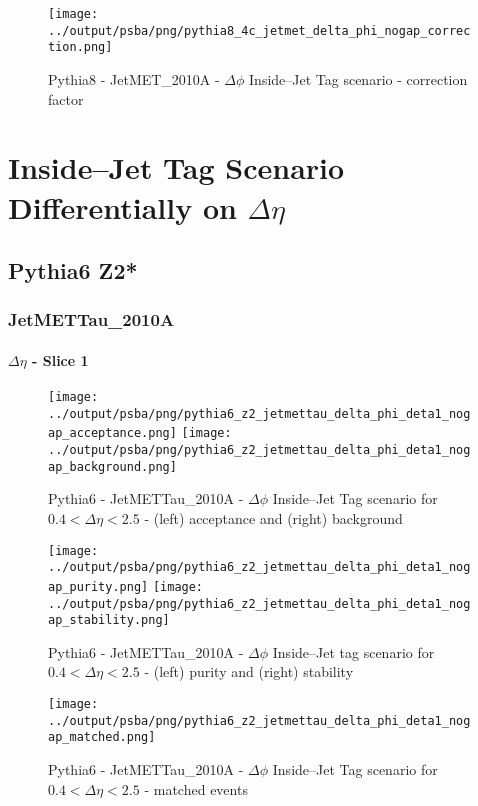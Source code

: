 \documentclass[11pt]{book}
\begin{document}
\begin{figure}[ht]
\centering
\texttt{[image: ../output/psba/png/pythia8\_4c\_jetmet\_delta\_phi\_nogap\_correction.png]}
\caption{Pythia8 - JetMET\_2010A - $\Delta\phi$ Inside--Jet Tag scenario - correction factor}
\label{fig:p8_jetmet_delta_phi_nogap_correction}
\end{figure}



\clearpage
\chapter{Inside--Jet Tag Scenario Differentially on $\Delta\eta$}
\section{Pythia6 Z2*}
\subsection{JetMETTau\_2010A}

\subsubsection{$\Delta\eta$ - Slice 1}
\begin{figure}[ht]
\centering
\texttt{[image: ../output/psba/png/pythia6\_z2\_jetmettau\_delta\_phi\_deta1\_nogap\_acceptance.png]}
\texttt{[image: ../output/psba/png/pythia6\_z2\_jetmettau\_delta\_phi\_deta1\_nogap\_background.png]}
\caption{Pythia6 - JetMETTau\_2010A - $\Delta\phi$ Inside--Jet Tag scenario for $0.4 < \Delta\eta < 2.5$ - (left) acceptance and (right) background}
\label{fig:p6_jetmettau_delta_phi_deta1_nogap_ab}
\end{figure}

\begin{figure}[ht]
\centering
\texttt{[image: ../output/psba/png/pythia6\_z2\_jetmettau\_delta\_phi\_deta1\_nogap\_purity.png]}
\texttt{[image: ../output/psba/png/pythia6\_z2\_jetmettau\_delta\_phi\_deta1\_nogap\_stability.png]}
\caption{Pythia6 - JetMETTau\_2010A - $\Delta\phi$ Inside--Jet tag scenario for $0.4 < \Delta\eta < 2.5$ - (left) purity and (right) stability}
\label{fig:p6_jetmettau_delta_phi_deta1_nogap_ps}
\end{figure}

\begin{figure}[ht]
\centering
\texttt{[image: ../output/psba/png/pythia6\_z2\_jetmettau\_delta\_phi\_deta1\_nogap\_matched.png]}
\caption{Pythia6 - JetMETTau\_2010A - $\Delta\phi$ Inside--Jet Tag scenario for $0.4 < \Delta\eta < 2.5$ - matched events}
\label{fig:p6_jetmettau_delta_phi_deta1_nogap_matched}
\end{figure}
\end{document}

